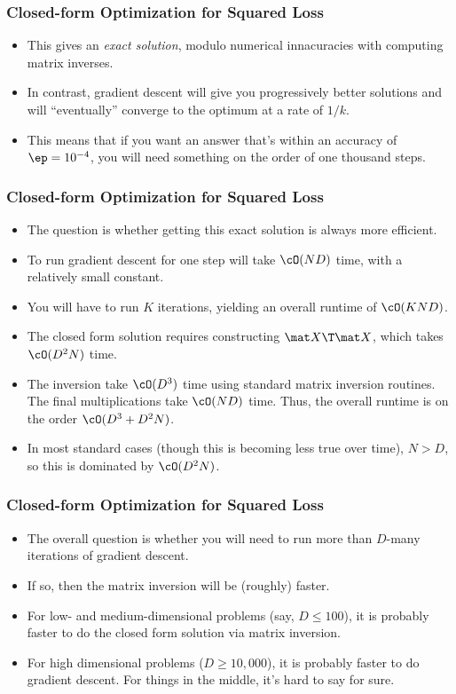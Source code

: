 \documentclass[trans,aspectratio=169]{beamer}
\begin{document}
\begin{frame}
  \frametitle{Closed-form Optimization for Squared Loss}
\begin{itemize}
\item This gives an \emph{exact solution}, modulo numerical
innacuracies with computing matrix inverses. 
\item In contrast, gradient
descent will give you progressively better solutions and will
``eventually'' converge to the optimum at a rate of $1/k$.  
\item This means
that if you want an answer that's within an accuracy of $\ep =
10^{-4}$, you will need something on the order of one thousand steps.
\end{itemize}
\end{frame}

\begin{frame}
  \frametitle{Closed-form Optimization for Squared Loss}
\begin{itemize}
\item 
The question is whether getting this exact solution is always more
efficient.
\item  To run gradient descent for one step will take $\cO(ND)$
time, with a relatively small constant.
\item  You will have to run $K$
iterations, yielding an overall runtime of $\cO(KND)$.  
\item The closed form solution requires constructing $\mat X\T\mat X$,
which takes $\cO(D^2 N)$ time. 
\item The inversion take $\cO(D^3)$ time
using standard matrix inversion routines.  The final multiplications
take $\cO(ND)$ time.  Thus, the overall runtime is on the order
$\cO(D^3 + D^2 N)$.  
\item In most standard cases (though this is becoming
less true over time), $N > D$, so this is dominated by $\cO(D^2 N)$.
\end{itemize}
\end{frame}

\begin{frame}
  \frametitle{Closed-form Optimization for Squared Loss}
\begin{itemize}
\item 
The overall question is whether you will need to run more than
$D$-many iterations of gradient descent.  
\item If so, then the matrix
inversion will be (roughly) faster.
\item For low- and medium-dimensional problems (say,
$D \leq 100$), it is probably faster to do the closed form solution
via matrix inversion. 
\item  For high dimensional problems ($D \geq
10,000$), it is probably faster to do gradient descent.  For things in
the middle, it's hard to say for sure.
\end{itemize}
\end{frame}
\end{document}
